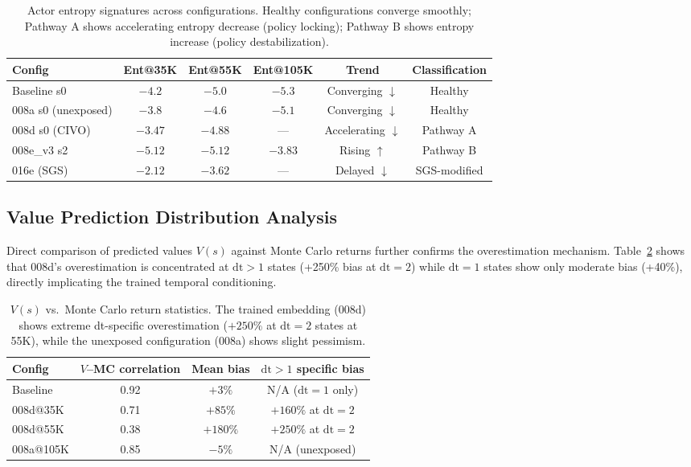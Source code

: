 \documentclass[10pt,letterpaper]{article}
\begin{document}
\begin{table}[h]
\centering
\caption{Actor entropy signatures across configurations. Healthy configurations converge smoothly; Pathway A shows accelerating entropy decrease (policy locking); Pathway B shows entropy increase (policy destabilization).}
\label{tab:entropy}
\small
\begin{tabular}{lccccc}
\toprule
Config & Ent@35K & Ent@55K & Ent@105K & Trend & Classification \\
\midrule
Baseline s0 & $-4.2$ & $-5.0$ & $-5.3$ & Converging $\downarrow$ & Healthy \\
008a s0 (unexposed) & $-3.8$ & $-4.6$ & $-5.1$ & Converging $\downarrow$ & Healthy \\
008d s0 (CIVO) & $-3.47$ & $-4.88$ & --- & Accelerating $\downarrow$ & Pathway A \\
008e\_v3 s2 & $-5.12$ & $-5.12$ & $-3.83$ & Rising $\uparrow$ & Pathway B \\
016e (SGS) & $-2.12$ & $-3.62$ & --- & Delayed $\downarrow$ & SGS-modified \\
\bottomrule
\end{tabular}
\end{table}

\subsection{Value Prediction Distribution Analysis}

Direct comparison of predicted values $V(s)$ against Monte Carlo returns further confirms the overestimation mechanism.
Table~\ref{tab:value_dist} shows that 008d's overestimation is concentrated at $\mathrm{dt}>1$ states (+250\% bias at $\mathrm{dt}=2$) while $\mathrm{dt}=1$ states show only moderate bias (+40\%), directly implicating the trained temporal conditioning.

\begin{table}[h]
\centering
\caption{$V(s)$ vs.\ Monte Carlo return statistics. The trained embedding (008d) shows extreme dt-specific overestimation ($+250\%$ at $\mathrm{dt}=2$ states at 55K), while the unexposed configuration (008a) shows slight pessimism.}
\label{tab:value_dist}
\small
\begin{tabular}{lccc}
\toprule
Config & $V$--MC correlation & Mean bias & $\mathrm{dt}>1$ specific bias \\
\midrule
Baseline & 0.92 & $+3\%$ & N/A ($\mathrm{dt}=1$ only) \\
008d@35K & 0.71 & $+85\%$ & $+160\%$ at $\mathrm{dt}=2$ \\
008d@55K & 0.38 & $+180\%$ & $+250\%$ at $\mathrm{dt}=2$ \\
008a@105K & 0.85 & $-5\%$ & N/A (unexposed) \\
\bottomrule
\end{tabular}
\end{table}
\end{document}
